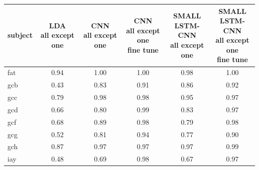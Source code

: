 \documentclass[
12pt, %
english, %
doublespacing, %
headsepline, %
]{MastersDoctoralThesis} %
\begin{document}
\begin{table}[t]
	\centering
	\label{table:AllExceptOne}	
	\begin{tabular}{l|ccccc}
		\toprule
		{subject} & \makecell{LDA \\ all except one} &  \makecell{CNN\\all except one}&  \makecell{CNN\\all except one\\fine tune}& \makecell{SMALL\\LSTM-CNN\\all except one}&\makecell{SMALL\\LSTM-CNN\\all except one \\ fine tune} \\
		\midrule
		fat     &                  0.94 &                  1.00 &                            1.00 &                             0.98 &                                               1.00 \\
		gcb     &                  0.43 &                  0.83 &                            0.91 &                             0.86 &                                               0.92 \\
		gcc     &                  0.79 &                  0.98 &                            0.98 &                             0.95 &                                               0.97 \\
		gcd     &                  0.66 &                  0.80 &                            0.99 &                             0.83 &                                               0.97 \\
		gcf     &                  0.68 &                  0.89 &                            0.98 &                             0.79 &                                               0.98 \\
		gcg     &                  0.52 &                  0.81 &                            0.94 &                             0.77 &                                               0.90 \\
		gch     &                  0.87 &                  0.97 &                            0.97 &                             0.97 &                                               0.99 \\
		iay     &                  0.48 &                  0.69 &                            0.98 &                             0.67 &                                               0.97 \\

\end{tabular}
\end{table}
\end{document}
